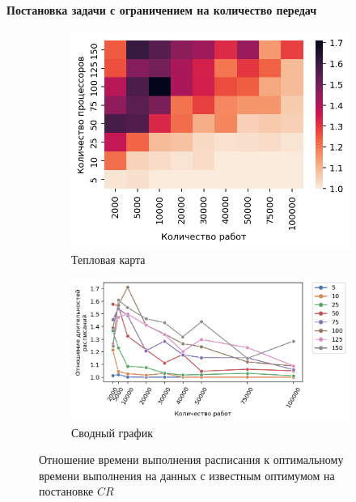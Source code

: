\paragraph{Постановка задачи с ограничением на количество передач}

\begin{figure}[!htbp]
    \centering
    \begin{subfigure}{0.49\textwidth}
        \includegraphics[width=\textwidth]{imgs/ideal_1/CR/th.png}
        \caption{Тепловая карта}
        \label{fig:CR-GC1-times-heatmap}
    \end{subfigure}
    \hfill
    \begin{subfigure}{0.49\textwidth}
        \includegraphics[width=\textwidth]{imgs/ideal_1/CR/gr_amalgamated.png}
        \caption{Сводный график}   
        \label{fig:CR-GC1-times-compiled} 
    \end{subfigure}
    \caption{Отношение времени выполнения расписания к оптимальному времени выполнения на данных с известным оптимумом на постановке $CR$}
\end{figure}

